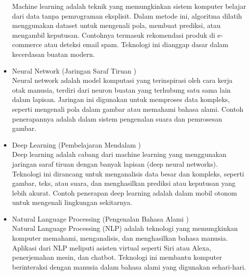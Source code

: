 \begin{subs}
\begin{itemize}
		      Machine learning adalah teknik yang memungkinkan sistem komputer belajar dari data tanpa pemrograman eksplisit. Dalam metode ini, algoritma dilatih menggunakan dataset untuk mengenali pola, membuat prediksi, atau mengambil keputusan. Contohnya termasuk rekomendasi produk di e-commerce atau deteksi email spam. Teknologi ini dianggap dasar dalam kecerdasan buatan modern.
		\item Neural Network (Jaringan Saraf Tiruan ) \\
		      Neural network adalah model komputasi yang terinspirasi oleh cara kerja otak manusia, terdiri dari neuron buatan yang terhubung satu sama lain dalam lapisan. Jaringan ini digunakan untuk memproses data kompleks, seperti mengenali pola dalam gambar atau memahami bahasa alami. Contoh penerapannya adalah dalam sistem pengenalan suara dan pemrosesan gambar.
		\item Deep Learning (Pembelajaran Mendalam ) \\
		      Deep learning adalah cabang dari machine learning yang menggunakan jaringan saraf tiruan dengan banyak lapisan (deep neural networks). Teknologi ini dirancang untuk menganalisis data besar dan kompleks, seperti gambar, teks, atau suara, dan menghasilkan prediksi atau keputusan yang lebih akurat. Contoh penerapan deep learning adalah dalam mobil otonom untuk mengenali lingkungan sekitarnya.
		\item Natural Language Processing (Pengenalan Bahasa Alami ) \\
		      Natural Language Processing (NLP) adalah teknologi yang memungkinkan komputer memahami, menganalisis, dan menghasilkan bahasa manusia. Aplikasi dari NLP meliputi asisten virtual seperti Siri atau Alexa, penerjemahan mesin, dan chatbot. Teknologi ini membantu komputer berinteraksi dengan manusia dalam bahasa alami yang digunakan sehari-hari.
	\end{itemize}
\end{subs}


